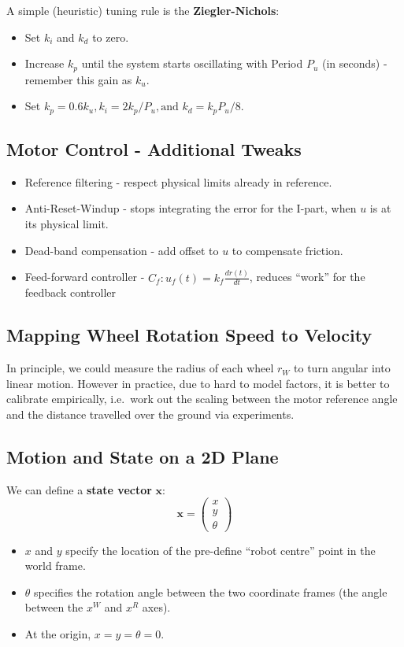 \documentclass[11pt]{article}
\begin{document}
A simple (heuristic) tuning rule is the \textbf{Ziegler-Nichols}:
\begin{itemize}
  \item Set $k_i$ and $k_d$ to zero.
  \item Increase $k_p$ until the system starts oscillating with Period $P_u$ (in seconds) - remember this gain as $k_u$.
  \item Set $k_p = 0.6k_u, k_i = 2k_p/P_u, \text{and } k_d = k_pP_u/8$.
\end{itemize}

\subsection{Motor Control - Additional Tweaks}
\begin{itemize}
  \item Reference filtering - respect physical limits already in reference.
  \item Anti-Reset-Windup - stops integrating the error for the I-part, when $u$ is at its physical limit.
  \item Dead-band compensation - add offset to $u$ to compensate friction.
  \item Feed-forward controller - $C_f : u_f(t) = k_f \frac{dr(t)}{dt}$, reduces ``work'' for the feedback controller
\end{itemize}

\subsection{Mapping Wheel Rotation Speed to Velocity}
In principle, we could measure the radius of each wheel $r_W$ to turn angular into linear motion.
However in practice, due to hard to model factors, it is better to calibrate empirically, i.e.\ work out the scaling between the motor reference angle and the distance travelled over the ground via experiments.

\subsection{Motion and State on a 2D Plane}
We can define a \textbf{state vector} $\textbf{x}$:
\[
  \textbf{x} = 
  \begin{pmatrix}
    x \\ y \\ \theta
  \end{pmatrix}
\]
\begin{itemize}
  \item $x$ and $y$ specify the location of the pre-define ``robot centre'' point in the world frame.
  \item $\theta$ specifies the rotation angle between the two coordinate frames (the angle between the $x^W$ and $x^R$ axes).
  \item At the origin, $x = y = \theta = 0$.
\end{itemize}
\end{document}
